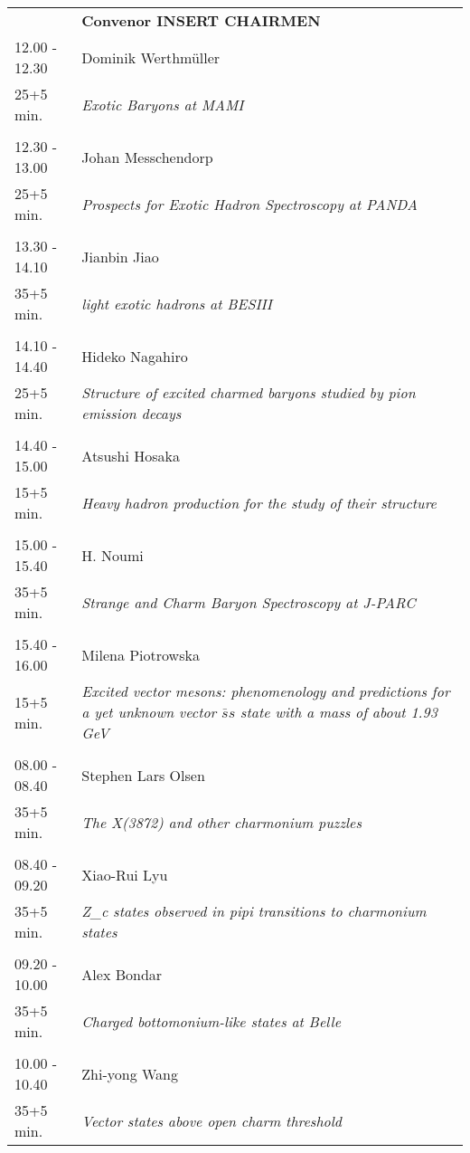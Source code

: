 \begin{longtable}{p{3cm}p{13cm}}
&\hfill {\bf Convenor INSERT CHAIRMEN }\\ 
12.00 - 12.30 & Dominik Werthmüller\\ 
25+5 min. & {\it Exotic Baryons at MAMI}\\ 
 & \\ 
12.30 - 13.00 & Johan Messchendorp\\ 
25+5 min. & {\it Prospects for Exotic Hadron Spectroscopy at PANDA}\\ 
 & \\ 
13.30 - 14.10 & Jianbin Jiao\\ 
35+5 min. & {\it light exotic hadrons at BESIII}\\ 
 & \\ 
14.10 - 14.40 & Hideko Nagahiro\\ 
25+5 min. & {\it Structure of excited charmed baryons studied by pion emission decays}\\ 
 & \\ 
14.40 - 15.00 & Atsushi Hosaka\\ 
15+5 min. & {\it Heavy hadron production for the study of their structure}\\ 
 & \\ 
15.00 - 15.40 & H. Noumi\\ 
35+5 min. & {\it Strange and Charm Baryon Spectroscopy at J-PARC}\\ 
 & \\ 
15.40 - 16.00 & Milena Piotrowska\\ 
15+5 min. & {\it Excited vector mesons: phenomenology and predictions for a yet unknown vector $\bar{s}s$ state with a mass of about 1.93 GeV}\\ 
 & \\ 
08.00 - 08.40 & Stephen Lars Olsen\\ 
35+5 min. & {\it The X(3872) and other charmonium puzzles}\\ 
 & \\ 
08.40 - 09.20 & Xiao-Rui Lyu\\ 
35+5 min. & {\it Z_c states observed in pipi transitions to charmonium states}\\ 
 & \\ 
09.20 - 10.00 & Alex Bondar\\ 
35+5 min. & {\it Charged bottomonium-like states at Belle}\\ 
 & \\ 
10.00 - 10.40 & Zhi-yong Wang\\ 
35+5 min. & {\it Vector states above open charm threshold}\\ 

\end{longtable}
